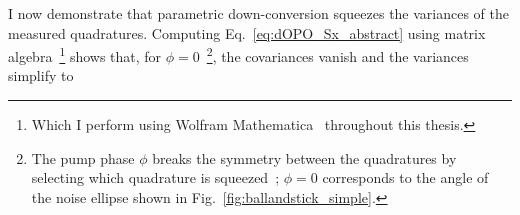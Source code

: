 I now demonstrate that parametric down-conversion squeezes the variances of the measured quadratures.
Computing Eq.~\ref{eq:dOPO_Sx_abstract} using matrix algebra~\footnote{Which I perform using Wolfram Mathematica~\cite{} throughout this thesis.} shows that, for $\phi=0$~\footnote{The pump phase $\phi$ breaks the symmetry between the quadratures by selecting which quadrature is squeezed~\cite{}; $\phi=0$ corresponds to the angle of the noise ellipse shown in Fig.~\ref{fig:ballandstick_simple}.}, the covariances vanish and the variances simplify to~\cite{} 
